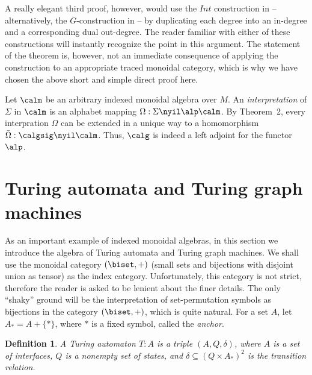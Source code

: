 \documentclass{eptcs}
\newtheorem{definition}{Definition}
\begin{document}
A really elegant third proof, however, would use the $Int$ construction in \cite{tra}
-- alternatively, the $G$-construction in \cite{concur} -- by duplicating each
degree into an in-degree and a corresponding dual out-degree. The reader
familiar with either of these constructions will instantly recognize the point in this
argument. The statement of the theorem is, however, not an immediate consequence
of applying the construction to an appropriate traced monoidal category,
which is why we have chosen the above short and simple direct proof here.
\vege


Let $\calm $ be an arbitrary indexed monoidal algebra over $M$. An {\em interpretation\/}
of $\Sigma $ in $\calm $ is an alphabet mapping $\Omega : \Sigma \nyil \alp \calm $.
By Theorem~2, every interpration $\Omega $ can be extended in a unique way to a 
homomorphism $\bar {\Omega }:\calgsig \nyil \calm $. Thus, $\calg $ is indeed a
left adjoint for the functor $\alp $.
\section{Turing automata and Turing graph machines}
As an important example of indexed monoidal algebras, in this section we introduce the
algebra of Turing automata and Turing graph machines. We shall use the monoidal 
category $(\biset ,+)$ (small sets and bijections with disjoint union as tensor) as the
index category. Unfortunately, this category is not
strict, therefore the reader is asked to be lenient about the finer details. The only
``shaky'' ground will be the interpretation of set-permutation symbols as bijections
in the category $(\biset ,+)$, which is quite natural.
For a set $A$, let $A_*=A+\{ *\}$,
where $*$ is a fixed symbol, called the {\em anchor}. 
\vspmini
\begin{definition}
{\em A {\em Turing automaton\/} $T:A$ is a triple $(A,Q,\delta )$, where $A$ is a set of
{\em interfaces}, $Q$ is a nonempty set of {\em states}, and $\delta \subseteq (Q\times A_*)^2$
is the {\em transition relation}.}\vspmini
\end{definition}
\end{document}
